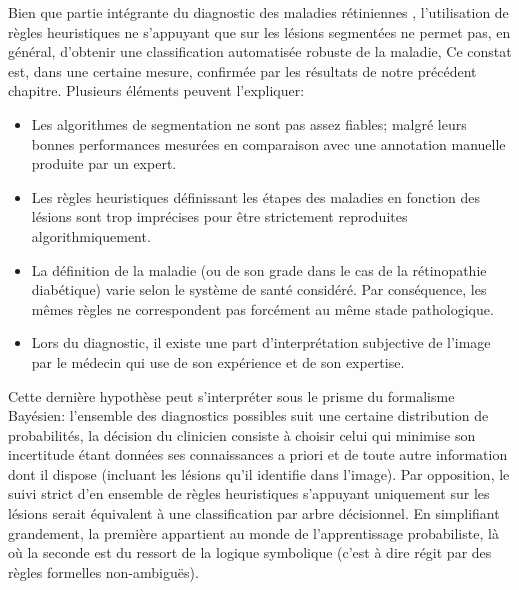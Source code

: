 \label{sec:Theme2}

Bien que partie intégrante du diagnostic des maladies rétiniennes \cite{boucherEvidencebasedCanadianGuidelines2020d}, l'utilisation de règles heuristiques ne s'appuyant que sur les lésions segmentées ne permet pas, en général, d'obtenir une classification automatisée robuste de la maladie, Ce constat est, dans une certaine mesure, confirmée par les résultats de notre précédent chapitre. Plusieurs éléments peuvent l'expliquer:
\begin{itemize}
	\item Les algorithmes de segmentation ne sont pas assez fiables; malgré leurs bonnes performances mesurées en comparaison avec une annotation manuelle produite par un expert.
	\item Les règles heuristiques définissant les étapes des maladies en fonction des lésions sont trop imprécises pour être strictement reproduites algorithmiquement.
	\item La définition de la maladie (ou de son grade dans le cas de la rétinopathie diabétique) varie selon le système de santé considéré. Par conséquence, les mêmes règles ne correspondent pas forcément au même stade pathologique.
	\item Lors du diagnostic, il existe une part d'interprétation subjective de l'image par le médecin qui use de son expérience et de son expertise. 
\end{itemize}
Cette dernière hypothèse peut s'interpréter sous le prisme du formalisme Bayésien: l'ensemble des diagnostics possibles suit une certaine distribution de probabilités, la décision du clinicien consiste à choisir celui qui minimise son incertitude étant données ses connaissances a priori et de toute autre information dont il dispose (incluant les lésions qu'il identifie dans l'image). 
Par opposition, le suivi strict d'en ensemble de règles heuristiques s'appuyant uniquement sur les lésions serait équivalent à une classification par arbre décisionnel. En simplifiant grandement, la première appartient au monde de l'apprentissage probabiliste, là où la seconde est du ressort de la logique symbolique (c'est à dire régit par des règles formelles non-ambiguës). \\
